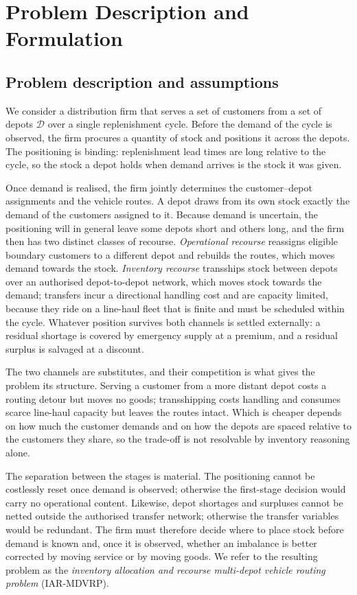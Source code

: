 \documentclass[authoryear,final,3p,times]{elsarticle}
\theoremstyle{definition}
\theoremstyle{plain}
\begin{document}
\section{Problem Description and Formulation}
\label{sec:problem_formulation}

\subsection{Problem description and assumptions}
\label{subsec:problem_description}

We consider a distribution firm that serves a set of customers from a set of
depots $\mathcal{D}$ over a single replenishment cycle.  Before the demand of
the cycle is observed, the firm procures a quantity of stock and positions it
across the depots.  The positioning is binding: replenishment lead times are
long relative to the cycle, so the stock a depot holds when demand arrives is
the stock it was given.

Once demand is realised, the firm jointly determines the customer--depot
assignments and the vehicle routes.  A depot draws from its own stock exactly
the demand of the customers assigned to it.  Because demand is uncertain, the
positioning will in general leave some depots short and others long, and the
firm then has two distinct classes of recourse.  \emph{Operational recourse}
reassigns eligible boundary customers to a different depot and rebuilds the
routes, which moves demand towards the stock.  \emph{Inventory recourse}
transships stock between depots over an authorised depot-to-depot network,
which moves stock towards the demand; transfers incur a directional handling
cost and are capacity limited, because they ride on a line-haul fleet that is
finite and must be scheduled within the cycle.  Whatever position survives both
channels is settled externally: a residual shortage is covered by emergency
supply at a premium, and a residual surplus is salvaged at a discount.

The two channels are substitutes, and their competition is what gives the
problem its structure.  Serving a customer from a more distant depot costs a
routing detour but moves no goods; transshipping costs handling and consumes
scarce line-haul capacity but leaves the routes intact.  Which is cheaper
depends on how much the customer demands and on how the depots are spaced
relative to the customers they share, so the trade-off is not resolvable by
inventory reasoning alone.

The separation between the stages is material.  The positioning cannot be
costlessly reset once demand is observed; otherwise the first-stage decision
would carry no operational content.  Likewise, depot shortages and surpluses
cannot be netted outside the authorised transfer network; otherwise the
transfer variables would be redundant.  The firm must therefore decide where to
place stock before demand is known and, once it is observed, whether an
imbalance is better corrected by moving service or by moving goods.  We refer
to the resulting problem as the \emph{inventory allocation and recourse
multi-depot vehicle routing problem} (IAR-MDVRP).
\end{document}
